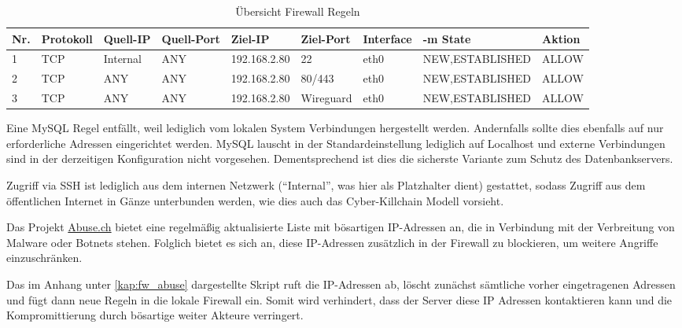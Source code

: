 \begin{table}[!ht]
    \centering
    \begin{adjustbox}{width=\textwidth}

    \begin{tabular}{|l|l|l|l|l|l|l|l|l|}
        \hline
            Nr. & Protokoll & Quell-IP & Quell-Port & Ziel-IP & Ziel-Port & Interface & -m State & Aktion \\ \hline
            1 & TCP & Internal & ANY & 192.168.2.80 & 22 & eth0 & NEW,ESTABLISHED & ALLOW \\ \hline
            2 & TCP & ANY & ANY & 192.168.2.80 & 80/443 & eth0 & NEW,ESTABLISHED & ALLOW \\ \hline
            3 & TCP & ANY & ANY & 192.168.2.80 & Wireguard & eth0 & NEW,ESTABLISHED & ALLOW \\ \hline
        \end{tabular}
    \end{adjustbox}
    \caption{Übersicht Firewall Regeln}
    \label{regeln_fw_incoming}
\end{table}

Eine MySQL Regel entfällt, weil lediglich vom lokalen System Verbindungen hergestellt werden. Andernfalls sollte dies ebenfalls auf nur erforderliche Adressen eingerichtet werden. MySQL lauscht in der Standardeinstellung lediglich auf Localhost und externe Verbindungen sind in der derzeitigen Konfiguration nicht vorgesehen. Dementsprechend ist dies die sicherste Variante zum Schutz des Datenbankservers.

Zugriff via \ac{SSH} ist lediglich aus dem internen Netzwerk (\enquote{Internal}, was hier als Platzhalter dient) gestattet, sodass Zugriff aus dem öffentlichen Internet in Gänze unterbunden werden, wie dies auch das Cyber-Killchain Modell vorsieht.

Das Projekt \href{https://abuse.ch}{Abuse.ch} bietet eine regelmäßig aktualisierte Liste mit bösartigen IP-Adressen an, die in Verbindung mit der Verbreitung von Malware oder Botnets stehen. Folglich bietet es sich an, diese IP-Adressen zusätzlich in der Firewall zu blockieren, um weitere Angriffe einzuschränken.

Das im Anhang unter \autoref{kap:fw_abuse} dargestellte Skript ruft die IP-Adressen ab, löscht zunächst sämtliche vorher eingetragenen Adressen und fügt dann neue Regeln in die lokale Firewall ein. Somit wird verhindert, dass der Server diese IP Adressen kontaktieren kann und die Kompromittierung durch bösartige weiter Akteure verringert.